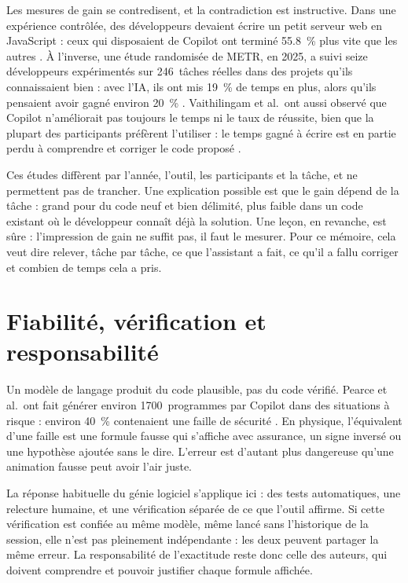 Les mesures de gain se contredisent, et la contradiction est instructive.
Dans une expérience contrôlée, des développeurs devaient écrire un petit
serveur web en JavaScript : ceux qui disposaient de Copilot ont terminé
\SI{55,8}{\percent} plus vite que les autres \cite{peng2023copilot}. À
l'inverse, une étude randomisée de METR, en 2025, a suivi seize développeurs
expérimentés sur 246~tâches réelles dans des projets qu'ils connaissaient
bien : avec l'IA, ils ont mis \SI{19}{\percent} de temps en plus, alors
qu'ils pensaient avoir gagné environ \SI{20}{\percent} \cite{becker2025metr}.
Vaithilingam et al.~ont aussi observé que Copilot n'améliorait pas toujours
le temps ni le taux de réussite, bien que la plupart des participants
préfèrent l'utiliser : le temps gagné à écrire est en partie perdu à
comprendre et corriger le code proposé \cite{vaithilingam2022}.

Ces études diffèrent par l'année, l'outil, les participants et la tâche, et
ne permettent pas de trancher. Une explication possible est que le gain
dépend de la tâche : grand pour du code neuf et bien délimité, plus faible
dans un code existant où le développeur connaît déjà la solution. Une leçon,
en revanche, est sûre : l'impression de gain ne suffit pas, il faut le
mesurer. Pour ce mémoire, cela veut dire relever, tâche par tâche, ce que
l'assistant a fait, ce qu'il a fallu corriger et combien de temps cela a
pris.

\section{Fiabilité, vérification et responsabilité}

Un modèle de langage produit du code plausible, pas du code vérifié. Pearce
et al.~ont fait générer environ \num{1700}~programmes par Copilot dans des
situations à risque : environ \SI{40}{\percent} contenaient une faille de
sécurité \cite{pearce2022asleep}. En physique, l'équivalent d'une faille est
une formule fausse qui s'affiche avec assurance, un signe inversé ou une
hypothèse ajoutée sans le dire. L'erreur est d'autant plus dangereuse qu'une
animation fausse peut avoir l'air juste.

La réponse habituelle du génie logiciel s'applique ici : des tests
automatiques, une relecture humaine, et une vérification séparée de ce que
l'outil affirme. Si cette vérification est confiée au même modèle, même lancé
sans l'historique de la session, elle n'est pas pleinement indépendante : les
deux peuvent partager la même erreur. La responsabilité de l'exactitude reste
donc celle des auteurs, qui doivent comprendre et pouvoir justifier chaque
formule affichée.

